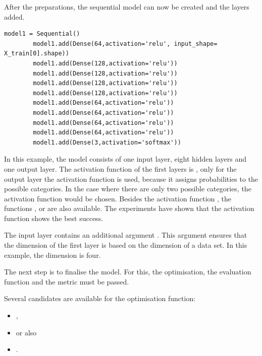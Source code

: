After the preparations, the sequential model can now be created and the layers added.

\begin{code}
    \begin{lstlisting}[numbers=none]
        model1 = Sequential()
        model1.add(Dense(64,activation='relu', input_shape= X_train[0].shape))
        model1.add(Dense(128,activation='relu'))
        model1.add(Dense(128,activation='relu'))
        model1.add(Dense(128,activation='relu'))
        model1.add(Dense(128,activation='relu'))
        model1.add(Dense(64,activation='relu'))
        model1.add(Dense(64,activation='relu'))
        model1.add(Dense(64,activation='relu'))
        model1.add(Dense(64,activation='relu'))
        model1.add(Dense(3,activation='softmax'))
    \end{lstlisting}
    
    \caption{Structure of the neural network for the data set Iris }
\end{code}

In this example, the model consists of one input layer, eight hidden layers and one output layer. The activation function of the first layers is , only for the output layer the activation function  is used, because it assigns probabilities to the possible categories. In the case where there are only two possible categories, the activation function  would be chosen. Besides the activation function , the functions ,  or  are also available. The experiments have shown that the activation function  shows the best success.

The input layer contains an additional argument . This argument ensures that the dimension of the first layer is based on the dimension of a data set. In this example, the dimension is four.

The next step is to finalise the model. For this, the optimisation, the evaluation function and the metric must be passed.

\medskip



\medskip

Several candidates are available for the optimisation function:

\begin{itemize}
    \item {}, 
    \item {} or also 
    \item {}.
\end{itemize}  

